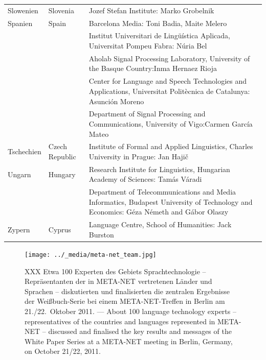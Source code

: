 \documentclass[]{../../metanetpaper}
\begin{document}
\begin{longtable}{@{}llp{113mm}@{}}
  Slowenien & \textcolor{grey1}{Slovenia} & Jozef Stefan Institute: Marko Grobelnik \\ \addlinespace 
  Spanien & \textcolor{grey1}{Spain} & Barcelona Media: Toni Badia, Maite Melero \\ \addlinespace 
  & & Institut Universitari de Lingüística Aplicada, Universitat Pompeu Fabra: Núria Bel \\ \addlinespace 
  & & Aholab Signal Processing Laboratory, University of the Basque Country:\newline Inma Hernaez Rioja \\ \addlinespace 
  & & Center for Language and Speech Technologies and Applications, Universitat Politècnica de Catalunya:  Asunción Moreno \\ \addlinespace 
  & & Department of Signal Processing and Communications, University of Vigo:\newline Carmen García Mateo \\ \addlinespace 
  Tschechien & \textcolor{grey1}{Czech Republic} & Institute of Formal and Applied Linguistics, Charles University in Prague: Jan Hajič \\ \addlinespace
  Ungarn & \textcolor{grey1}{Hungary} & Research Institute for Linguistics, Hungarian Academy of Sciences: Tamás Váradi\\  \addlinespace
  & & Department of Telecommunications and Media Informatics, Budapest University of Technology and Economics: Géza Németh and Gábor Olaszy\\ \addlinespace
  Zypern & \textcolor{grey1}{Cyprus} & Language Centre, School of Humanities: Jack Burston
\end{longtable}
\normalsize

\renewcommand*{\figureformat}{}
\renewcommand*{\captionformat}{}

\begin{figure}[htbp]
  \center
  \texttt{[image: ../\_media/meta-net\_team.jpg]}
  \caption{XXX Etwa 100 Experten des Gebiets Sprachtechnologie -- Repräsentanten der in META-NET vertretenen Länder und Sprachen -- diskutierten und finalisierten die zentralen Ergebnisse der Weißbuch-Serie bei einem META-NET-Treffen in Berlin am 21./22.~Oktober 2011. --- \textcolor{grey1}{About 100 language technology experts -- representatives of the countries and languages represented in META-NET -- discussed and finalised the key results and messages of the White Paper Series at a META-NET meeting in Berlin, Germany, on October 21/22, 2011.}}
  \medskip
\end{figure}
\end{document}
